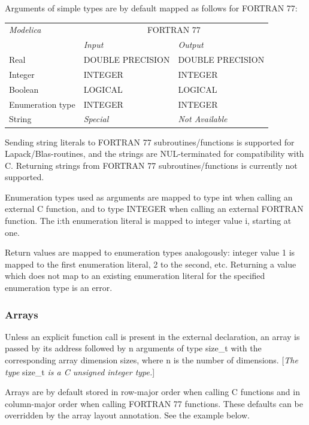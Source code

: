 \documentclass[10pt,a4paper]{report}
\def\doublelabel#1{\label{#1}}
\begin{document}
Arguments of simple types are by default mapped as follows for FORTRAN
77:

\begin{longtable}[]{|l|l|l|}
\hline
\emph{Modelica} & \multicolumn{2}{c|}{FORTRAN 77}\\ 
& \emph{Input} & \emph{Output}\\ \hline
\endhead
Real & DOUBLE PRECISION & DOUBLE PRECISION\\ \hline
Integer & INTEGER & INTEGER\\ \hline
Boolean & LOGICAL & LOGICAL\\ \hline
Enumeration type & INTEGER & INTEGER\\ \hline
String & \emph{Special} & \emph{Not Available}\\ \hline
\end{longtable}

Sending string literals to FORTRAN 77 subroutines/functions is supported
for Lapack/Blas-routines, and the strings are NUL-terminated for
compatibility with C. Returning strings from FORTRAN 77
subroutines/functions is currently not supported.

Enumeration types used as arguments are mapped to type int when calling
an external C function, and to type INTEGER when calling an external
FORTRAN function. The i:th enumeration literal is mapped to integer
value i, starting at one.

Return values are mapped to enumeration types analogously: integer value
1 is mapped to the first enumeration literal, 2 to the second, etc.
Returning a value which does not map to an existing enumeration literal
for the specified enumeration type is an error.

\subsubsection{Arrays}\doublelabel{arrays-1}

Unless an explicit function call is present in the external declaration,
an array is passed by its address followed by n arguments of type
size\_t with the corresponding array dimension sizes, where n is the
number of dimensions. {[}\emph{The type} size\_t \emph{is a C unsigned
integer type.}{]}

Arrays are by default stored in row-major order when calling C functions
and in column-major order when calling FORTRAN 77 functions. These
defaults can be overridden by the array layout annotation. See the
example below.
\end{document}
